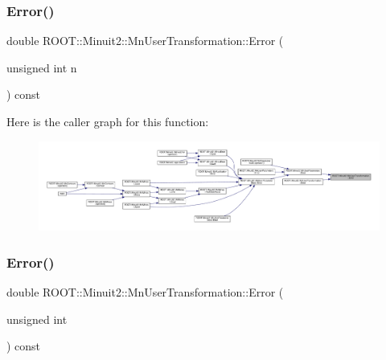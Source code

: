 \mbox{\label{classROOT_1_1Minuit2_1_1MnUserTransformation_a9d7f873342a58fe078edd10cc2175faf}} 
\subsubsection{\texorpdfstring{Error()}{Error()}\hspace{0.1cm}{\footnotesize\ttfamily [2/6]}}
{\footnotesize\ttfamily double R\+O\+O\+T\+::\+Minuit2\+::\+Mn\+User\+Transformation\+::\+Error (\begin{DoxyParamCaption}\item[{unsigned int}]{n }\end{DoxyParamCaption}) const}

Here is the caller graph for this function\+:
\nopagebreak
\begin{figure}[H]
\begin{center}
\leavevmode
\includegraphics[width=350pt]{d9/d98/classROOT_1_1Minuit2_1_1MnUserTransformation_a9d7f873342a58fe078edd10cc2175faf_icgraph}
\end{center}
\end{figure}
\mbox{\label{classROOT_1_1Minuit2_1_1MnUserTransformation_a9d7f873342a58fe078edd10cc2175faf}} 
\subsubsection{\texorpdfstring{Error()}{Error()}\hspace{0.1cm}{\footnotesize\ttfamily [3/6]}}
{\footnotesize\ttfamily double R\+O\+O\+T\+::\+Minuit2\+::\+Mn\+User\+Transformation\+::\+Error (\begin{DoxyParamCaption}\item[{unsigned int}]{ }\end{DoxyParamCaption}) const}


